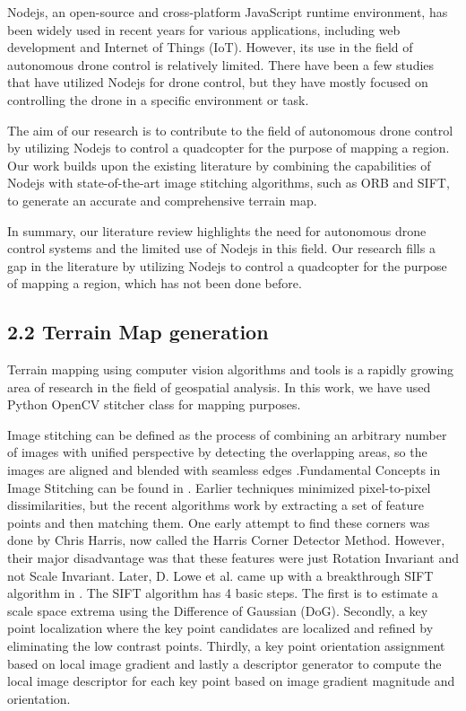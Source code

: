 \documentclass[
  journal=largetwo,
  manuscript=article-type,
  year=2023,
  volume=1,
]{iitp-journal}
\begin{document}
Nodejs, an open-source and cross-platform JavaScript runtime environment, has been widely used in recent years for various applications, including web development and Internet of Things (IoT). However, its use in the field of autonomous drone control is relatively limited. There \cite{4} have been a few studies that have utilized Nodejs for drone control, but they have mostly focused on controlling the drone in a specific environment or task.

The aim of our research is to contribute to the field of autonomous drone control by utilizing Nodejs to control a quadcopter for the purpose of mapping a region. Our work builds upon the existing literature by combining the capabilities of Nodejs with state-of-the-art image stitching algorithms, such as ORB and SIFT, to generate an accurate and comprehensive terrain map.

In summary, our literature review highlights the need for autonomous drone control systems and the limited use of Nodejs in this field. Our research fills a gap in the literature by utilizing Nodejs to control a quadcopter for the purpose of mapping a region, which has not been done before.

\subsection{2.2 Terrain Map generation}
Terrain mapping using computer vision algorithms and tools is a rapidly growing area of research in the field of geospatial analysis. In this work, we have used Python OpenCV stitcher class for mapping purposes.

Image stitching can be defined as the process of combining an arbitrary number of images with unified perspective by detecting the overlapping areas, so the images are aligned and blended with seamless edges .Fundamental Concepts in Image Stitching can be found in \cite{5}. Earlier techniques minimized pixel-to-pixel dissimilarities, but the recent algorithms work by extracting a set of feature points and then matching them. One early attempt to find these corners was done by Chris Harris, now called the Harris Corner Detector Method. However, their major disadvantage was that these features were just Rotation Invariant and not Scale Invariant. Later, D. Lowe et al. came up with a breakthrough SIFT algorithm in \cite{6}. The SIFT algorithm has 4 basic steps. The first is to estimate a scale space extrema using the Difference of Gaussian (DoG). Secondly, a key point localization where the key point candidates are localized and refined by eliminating the low contrast points. Thirdly, a key point orientation assignment based on local image gradient and lastly a descriptor generator to compute the local image descriptor for each key point based on image gradient magnitude and orientation.
\end{document}
